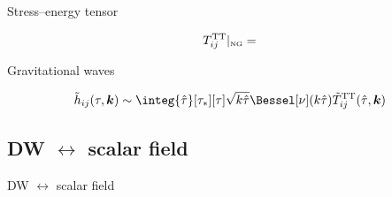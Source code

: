 

\begin{frame}{Stress--energy tensor}
    
    \begin{equation}
        T_{ij}^{\text{TT}}\rvert_{\text{\tiny{NG}}} = 
    \end{equation}

\end{frame}


\begin{frame}{Gravitational waves}
    
    \begin{equation}
        \tilde{h}_{ij}(\tau, \vec{k}) \sim \integ{\hat{\tau}}[\tau_\ast][\tau] \sqrt{k\hat{\tau}}\Bessel[\nu](k\hat{\tau}) \tilde{T}_{ij}^{\text{TT}}(\hat{\tau}, \vec{k}) 
    \end{equation}

\end{frame}






\subsection{DW $\leftrightarrow$ scalar field}


\begin{frame}{DW $\leftrightarrow$ scalar field}
    
\end{frame}





